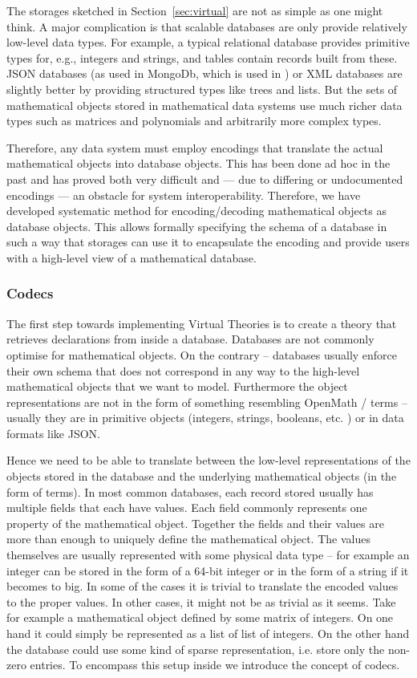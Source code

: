 The storages sketched in Section~\ref{sec:virtual} are not as simple as one might think.
A major complication is that scalable databases are only provide relatively low-level data types.
For example, a typical relational database provides primitive types for, e.g., integers and strings, and tables contain records built from these.
JSON databases (as used in MongoDb\cite{}, which is used in \LMFDB) or XML databases are slightly better by providing structured types like trees and lists.
But the sets of mathematical objects stored in mathematical data systems use much richer data types such as matrices and polynomials and arbitrarily more complex types.

Therefore, any data system must employ encodings that translate the actual mathematical objects into database objects.
This has been done ad hoc in the past and has proved both very difficult and --- due to differing or undocumented encodings --- an obstacle for system interoperability.
Therefore, we have developed systematic method for encoding/decoding mathematical objects as database objects.
This allows formally specifying the schema of a database in such a way that \MMT storages can use it to encapsulate the encoding and provide users with a high-level view of a mathematical database.

\subsubsection{Codecs}

The first step towards implementing Virtual Theories is to create a theory that retrieves
declarations from inside a database. Databases are not commonly optimise for mathematical
objects. On the contrary -- databases usually enforce their own schema that does not
correspond in any way to the high-level mathematical objects that we want to
model. Furthermore the object representations are not in the form of something resembling
OpenMath / \MMT terms -- usually they are in primitive objects (integers, strings,
booleans, etc. ) or in data formats like JSON.

Hence we need to be able to translate between the low-level representations of the objects
stored in the database and the underlying mathematical objects (in the form of \MMT terms). In
most common databases, each record stored usually has multiple fields that each have values.
Each field commonly represents one property of the mathematical object. Together the fields and
their values are more than enough to uniquely define the mathematical object. The values
themselves are usually represented with some physical data type -- for example an integer can
be stored in the form of a 64-bit integer or in the form of a string if it becomes to big. In
some of the cases it is trivial to translate the encoded values to the proper values. In other
cases, it might not be as trivial as it seems. Take for example a mathematical object defined
by some matrix of integers. On one hand it could simply be represented as a list of list of
integers. On the other hand the database could use some kind of sparse representation, i.e.
store only the non-zero entries. To encompass this setup inside \MMT we introduce the concept
of codecs.

